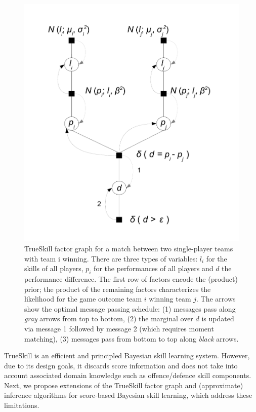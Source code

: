 \documentclass[runningheads,a4paper]{llncs}
\begin{document}
\begin{figure}[t!]
\vspace{-5mm}
\centerline{\includegraphics[scale=0.3]{TrueSkill}}
\vspace{-5mm}
\caption{\small TrueSkill factor graph for a match between two single-player
teams with team i winning.
There are three types of variables: $l_i$
for the skills of all players, $p_i$ for the performances of all
players and $d$ the performance difference. The first row of factors
encode the (product) prior; the product of the remaining factors
characterizes the likelihood for the game outcome team $i$ winning team $j$.
The arrows show the optimal message passing schedule: (1)
messages pass along \emph{gray} arrows from top to bottom, (2) the
marginal over $d$ is updated via message 1 followed by message 2
(which requires moment matching), (3) messages pass from bottom to top
along \emph{black} arrows.}
\label{fig:trueskill}
\vspace{-3mm}
\end{figure}

TrueSkill is an efficient and principled Bayesian skill learning
system.  However, due to its design goals, it discards score
information and does not take into account associated domain knowledge
such as offence/defence skill components.  Next,
we propose extensions of the TrueSkill factor graph and (approximate)
inference algorithms for score-based Bayesian skill learning, which
address these limitations.
\end{document}
